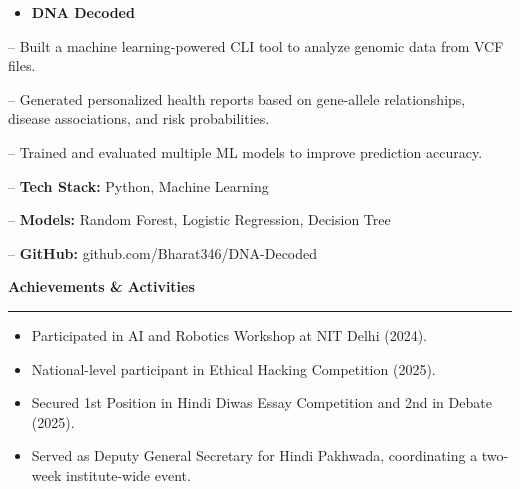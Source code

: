 \documentclass[11pt]{article}
\begin{document}
\vspace{6pt}
\begin{itemize}[leftmargin=16pt,itemsep=0pt,topsep=0pt]
\item \textbf{DNA Decoded}
\end{itemize}
\hspace*{14pt}-- Built a machine learning-powered CLI tool to analyze genomic data from VCF files.\par
\hspace*{14pt}-- Generated personalized health reports based on gene-allele relationships, disease associations, and risk probabilities.\par
\hspace*{14pt}-- Trained and evaluated multiple ML models to improve prediction accuracy.\par
\hspace*{14pt}-- \textbf{Tech Stack:} Python, Machine Learning\par
\hspace*{14pt}-- \textbf{Models:} Random Forest, Logistic Regression, Decision Tree\par
\hspace*{14pt}-- \textbf{GitHub:} github.com/Bharat346/DNA-Decoded

\vspace{10pt}
{\fontsize{15}{17}\selectfont\bfseries Achievements \& Activities\par}
\vspace{2pt}
{\color{rulegray}\rule{\textwidth}{0.5pt}}
\vspace{5pt}
\begin{itemize}[leftmargin=16pt,itemsep=4pt,topsep=0pt]
\item Participated in AI and Robotics Workshop at NIT Delhi (2024).
\item National-level participant in Ethical Hacking Competition (2025).
\item Secured 1st Position in Hindi Diwas Essay Competition and 2nd in Debate (2025).
\item Served as Deputy General Secretary for Hindi Pakhwada, coordinating a two-week institute-wide event.
\end{itemize}
\end{document}
